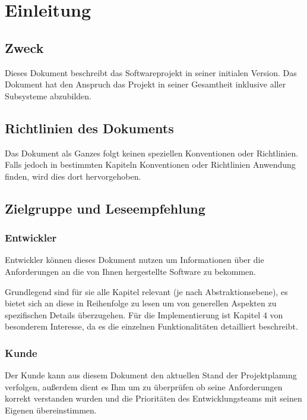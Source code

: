 \section{Einleitung}
\subsection{Zweck}
Dieses Dokument beschreibt das Softwareprojekt  in seiner initialen Version.
Das Dokument hat den Anspruch das Projekt in seiner Gesamtheit inklusive aller Subsysteme abzubilden.

\subsection{Richtlinien des Dokuments}

Das Dokument als Ganzes folgt keinen speziellen Konventionen oder Richtlinien. %
Falls jedoch in bestimmten Kapiteln Konventionen oder Richtlinien Anwendung finden, wird dies dort hervorgehoben. 

\subsection{Zielgruppe und Leseempfehlung}
\subsubsection{Entwickler}

Entwickler können dieses Dokument nutzen um Informationen über die Anforderungen an die von Ihnen hergestellte Software zu bekommen. 

Grundlegend sind für sie alle Kapitel relevant (je nach Abstraktionsebene), es bietet sich an diese in Reihenfolge zu lesen um von generellen Aspekten zu spezifischen Details überzugehen. 
Für die Implementierung ist Kapitel 4 von besonderem Interesse, da es die einzelnen Funktionalitäten detailliert beschreibt.

\subsubsection{Kunde}
Der Kunde kann aus diesem Dokument den aktuellen Stand der Projektplanung verfolgen, 
außerdem dient es Ihm um zu überprüfen ob seine Anforderungen korrekt verstanden wurden und die Prioritäten des Entwicklungsteams mit seinen Eigenen übereinstimmen.

